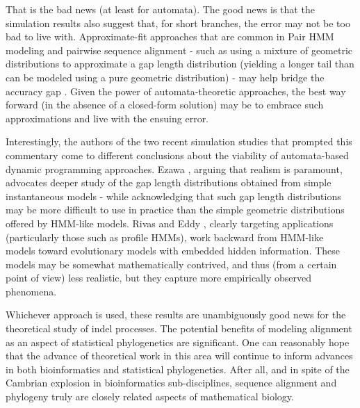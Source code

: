 \documentclass{bmcart}
\begin{document}
That is the bad news (at least for automata).
The good news is that the simulation results also suggest that,
for short branches, the error may not be too bad to live with.
Approximate-fit approaches that are common in Pair HMM modeling and pairwise sequence alignment - such as using a mixture
of geometric distributions to approximate a gap length distribution (yielding a longer tail than can be modeled
using a pure geometric distribution) - may help bridge the accuracy gap \cite{DoEtAl2005}.
Given the power of automata-theoretic approaches, the best way forward
(in the absence of a closed-form solution) may be to embrace such approximations and live with the ensuing error.

Interestingly, the authors of the two recent simulation studies that prompted this commentary
come to different conclusions about the viability of automata-based dynamic programming approaches.
Ezawa \cite{Ezawa2016a,Ezawa2016b}, arguing that realism is paramount, advocates deeper study of the
gap length distributions obtained from simple instantaneous models - while acknowledging that such gap length distributions
may be more difficult to use in practice than the simple geometric distributions offered by HMM-like models.
Rivas and Eddy \cite{RivasEddy2015}, clearly targeting applications (particularly those such as profile HMMs),
work backward from HMM-like models toward evolutionary models with embedded
hidden information.
These models may be somewhat mathematically contrived, and thus (from a certain point of view) less realistic,
but they capture more empirically observed phenomena.

Whichever approach is used, these results are unambiguously good news for the theoretical study of indel processes.
The potential benefits of modeling alignment as an aspect of statistical phylogenetics are significant.
One can reasonably hope that the advance of theoretical work in this area 
will continue to inform advances in both bioinformatics and statistical phylogenetics.
After all, and in spite of the Cambrian explosion in bioinformatics sub-disciplines,
sequence alignment and phylogeny truly are closely related aspects of mathematical biology.



\end{document}
